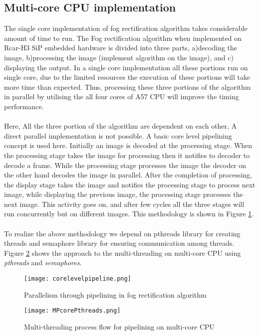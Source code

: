\subsection{Multi-core CPU implementation}
The single core implementation of fog rectification algorithm takes considerable amount of time to run. The Fog rectification algorithm when implemented on Rcar-H3 SiP embedded hardware is divided into three parts, a)decoding the image, b)processing the image (implement algorithm on the image), and c) displaying the output. In a single core implementation all these portions run on single core, due to the limited resources the execution of these portions will take more time than expected. Thus, processing these three portions of the algorithm in parallel by utilising the all four cores of A57 CPU will improve the timing performance. \paragraph*{} Here, All the three portion of the algorithm are dependent on each other, A direct parallel implementation is not possible. A basic core level pipelining concept is used here. Initially an image is decoded at the processing stage. When the processing stage takes the image for processing then it notifies to decoder to decode a frame. While the processing stage processes the image the decoder on the other hand decodes the image in parallel.  After the completion of processing, the display stage takes the image and notifies the processing stage to process next image, while displaying the previous image, the processing stage processes the next image. This activity goes on, and after few cycles all the three stages will run concurrently but on different images. This methodology is shown in Figure \ref{fig:Parallelism through pipelining}.\paragraph*{} To realize the above methodology we depend on pthreads library for creating threads and semaphore library for ensuring communication among threads. Figure \ref{fig:multi-threading} shows the approach to the multi-threading on multi-core CPU using \textit{pthreads} and \textit{semaphores}.
\begin{figure}[htb]
	\centering
	\texttt{[image: corelevelpipeline.png]}
	\caption{Parallelism through pipelining in fog rectification algorithm}
	\label{fig:Parallelism through pipelining}
\end{figure}%
\begin{figure}[h!]
	\centering
	\texttt{[image: MPcorePthreads.png]}
	\caption{Multi-threading process flow for pipelining on multi-core CPU}
	\label{fig:multi-threading}
\end{figure}%
